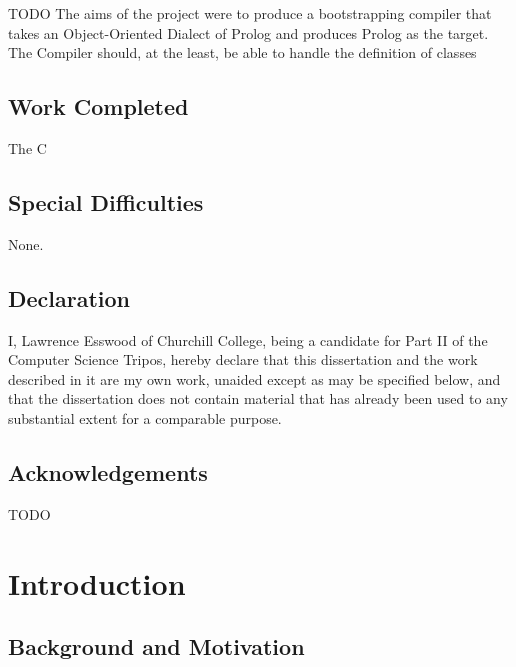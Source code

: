 \documentclass[12pt,a4paper,twoside,openright]{report}
\begin{document}
TODO
The aims of the project were to produce a bootstrapping compiler that takes an Object-Oriented Dialect of Prolog and produces Prolog as the target. The Compiler should, at the least, be able to handle the definition of classes

\section*{Work Completed}

The C

\section*{Special Difficulties}

None.
 
\newpage
\section*{Declaration}

I, Lawrence Esswood of Churchill College, being a candidate for Part II of the Computer
Science Tripos, hereby declare that this dissertation and the work described in it are my own work,
unaided except as may be specified below, and that the dissertation
does not contain material that has already been used to any substantial
extent for a comparable purpose.

\bigskip
{}

\medskip
{}

\tableofcontents

\listoffigures

\newpage
\section*{Acknowledgements}

TODO


\pagestyle{headings}

\chapter{Introduction}

\section{Background and Motivation}
\end{document}
